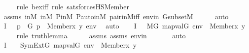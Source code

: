 \begin{isabellebody}
\ \ \ \ \isamarkupfalse%
{\isacharparenleft}{\kern0pt}rule\ bex{\isacharunderscore}{\kern0pt}iff{\isacharcomma}{\kern0pt}\ rule\ sats{\isacharunderscore}{\kern0pt}forcesHS{\isacharunderscore}{\kern0pt}Member{\isacharparenright}{\kern0pt}\isanewline
\ \ \ \ \isamarkupfalse%
\ assms{}\ {\isasymF}{\isacharunderscore}{\kern0pt}in{\isacharunderscore}{\kern0pt}M\ {\isasymG}{\isacharunderscore}{\kern0pt}in{\isacharunderscore}{\kern0pt}M\ P{\isacharunderscore}{\kern0pt}in{\isacharunderscore}{\kern0pt}M\ P{\isacharunderscore}{\kern0pt}auto{\isacharunderscore}{\kern0pt}in{\isacharunderscore}{\kern0pt}M\ pair{\isacharunderscore}{\kern0pt}in{\isacharunderscore}{\kern0pt}M{\isacharunderscore}{\kern0pt}iff\ envin\ GsubsetM\isanewline
\ \ \ \ \isamarkupfalse%
\ auto\isanewline
\ \ \isamarkupfalse%
\ I{}{\isacharcolon}{\kern0pt}\ {\isachardoublequoteopen}{\isachardot}{\kern0pt}{\isachardot}{\kern0pt}{\isachardot}{\kern0pt}\ {\isasymlongleftrightarrow}\ {\isacharparenleft}{\kern0pt}{\isasymexists}p\ {\isasymin}\ G{\isachardot}{\kern0pt}\ p\ {\isasymtturnstile}\ Member{\isacharparenleft}{\kern0pt}x{\isacharcomma}{\kern0pt}\ y{\isacharparenright}{\kern0pt}\ env{\isacharparenright}{\kern0pt}{\isachardoublequoteclose}\ \isamarkupfalse%
\ auto\isanewline
\ \ \isamarkupfalse%
\ I{}{\isacharcolon}{\kern0pt}\ {\isachardoublequoteopen}{\isachardot}{\kern0pt}{\isachardot}{\kern0pt}{\isachardot}{\kern0pt}\ {\isasymlongleftrightarrow}\ M{\isacharbrackleft}{\kern0pt}G{\isacharbrackright}{\kern0pt}{\isacharcomma}{\kern0pt}\ map{\isacharparenleft}{\kern0pt}val{\isacharparenleft}{\kern0pt}G{\isacharparenright}{\kern0pt}{\isacharcomma}{\kern0pt}\ env{\isacharparenright}{\kern0pt}\ {\isasymTurnstile}\ Member{\isacharparenleft}{\kern0pt}x{\isacharcomma}{\kern0pt}\ y{\isacharparenright}{\kern0pt}{\isachardoublequoteclose}\ \isanewline
\ \ \ \ \isamarkupfalse%
{\isacharparenleft}{\kern0pt}rule\ truth{\isacharunderscore}{\kern0pt}lemma{\isacharparenright}{\kern0pt}\isanewline
\ \ \ \ \isamarkupfalse%
\ assms{}\ assms\ envin\ \isanewline
\ \ \ \ \isamarkupfalse%
\ auto\isanewline
\ \ \isamarkupfalse%
\ I{}\ {\isacharcolon}{\kern0pt}\ {\isachardoublequoteopen}{\isachardot}{\kern0pt}{\isachardot}{\kern0pt}{\isachardot}{\kern0pt}\ {\isasymlongleftrightarrow}\ SymExt{\isacharparenleft}{\kern0pt}G{\isacharparenright}{\kern0pt}{\isacharcomma}{\kern0pt}\ map{\isacharparenleft}{\kern0pt}val{\isacharparenleft}{\kern0pt}G{\isacharparenright}{\kern0pt}{\isacharcomma}{\kern0pt}\ env{\isacharparenright}{\kern0pt}\ {\isasymTurnstile}\ Member{\isacharparenleft}{\kern0pt}x{\isacharcomma}{\kern0pt}\ y{\isacharparenright}{\kern0pt}{\isachardoublequoteclose}\ \isanewline

\end{isabellebody}

